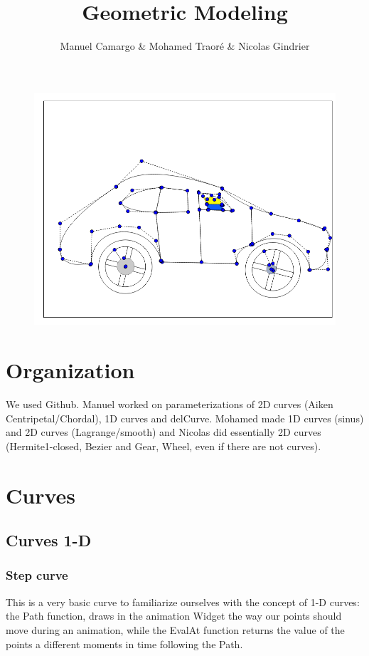 \documentclass{article}
\title{Geometric Modeling}
\author{Manuel Camargo & Mohamed Traoré &  Nicolas Gindrier}
\date{}
\begin{document}
\maketitle
\begin{figure}[H]
   \includegraphics[scale = 0.5]{Pictures/narutovoiture.png}
\end{figure}
\section*{Organization}
We used Github. Manuel worked on parameterizations of 2D curves (Aiken Centripetal/Chordal), 1D curves and delCurve. Mohamed made 1D curves (sinus) and 2D curves (Lagrange/smooth) and Nicolas did essentially 2D curves (Hermite1-closed, Bezier and Gear, Wheel, even if there are not curves). 
\section*{Curves}
\subsection*{Curves 1-D}
\subsubsection*{Step curve}

This is a very basic curve to familiarize ourselves with the concept of 1-D curves: the Path function, draws in the animation Widget the way our points should move during an animation, while the EvalAt function returns the value of the points a different moments in time following the Path.
\end{document}
